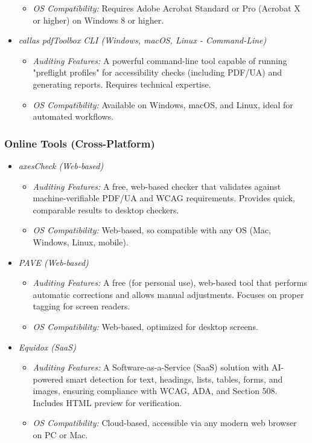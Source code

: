 \begin{itemize}
\begin{itemize}
\item \emph{OS Compatibility:} Requires Adobe Acrobat Standard or Pro (Acrobat X or higher) on Windows 8 or higher.
\end{itemize}
\item \emph{callas pdfToolbox CLI (Windows, macOS, Linux - Command-Line)}\cite{CallasPDFToolbox}
\begin{itemize}
\item \emph{Auditing Features:} A powerful command-line tool capable of running "preflight profiles" for accessibility checks (including PDF/UA) and generating reports. Requires technical expertise.
\item \emph{OS Compatibility:} Available on Windows, macOS, and Linux, ideal for automated workflows.
\end{itemize}
\end{itemize}

\subsubsection{Online Tools (Cross-Platform)}
\label{subsubsec:online-tools}
\begin{itemize}
\item \emph{axesCheck (Web-based)}\cite{AxesCheck}
\begin{itemize}
\item \emph{Auditing Features:} A free, web-based checker that validates against machine-verifiable PDF/UA and WCAG requirements. Provides quick, comparable results to desktop checkers.
\item \emph{OS Compatibility:} Web-based, so compatible with any OS (Mac, Windows, Linux, mobile).
\end{itemize}
\item \emph{PAVE (Web-based)}\cite{PAVE}
\begin{itemize}
\item \emph{Auditing Features:} A free (for personal use), web-based tool that performs automatic corrections and allows manual adjustments. Focuses on proper tagging for screen readers.
\item \emph{OS Compatibility:} Web-based, optimized for desktop screens.
\end{itemize}
\item \emph{Equidox (SaaS)}\cite{Equidox}
\begin{itemize}
\item \emph{Auditing Features:} A Software-as-a-Service (SaaS) solution with AI-powered smart detection for text, headings, lists, tables, forms, and images, ensuring compliance with WCAG, ADA, and Section 508. Includes HTML preview for verification.
\item \emph{OS Compatibility:} Cloud-based, accessible via any modern web browser on PC or Mac.
\end{itemize}
\end{itemize}

